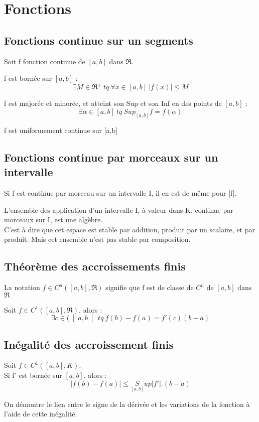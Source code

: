 \section{Fonctions}
\subsection{Fonctions continue sur un segments}
Soit f fonction continue de $\left[a,b\right] $ dans $\Re$.
\begin{prop}
f est bornée sur $\left[a,b\right]$ :
$$\exists M \in \Re^+~ tq~ \forall x \in \left[a,b\right]~ |f(x)| \leq M$$
\end{prop}
\begin{prop}
f est majorée et minorée, et atteint son Sup et son Inf en des points de $\left[a,b\right]$ : 
$$\exists \alpha \in \left[a,b\right]~ tq~ Sup_{\left[a,b\right]} f = f(\alpha)$$
\end{prop}
\begin{prop}
f est uniformement continue sur [a,b]
\end{prop}
\subsection{Fonctions continue par morceaux sur un intervalle}
\begin{prop}
Si f est continue par morceau sur un intervalle I, il en est de même pour |f|.
\end{prop}
\begin{prop}
L'ensemble des application d'un intervalle I, à valeur dans K, continue par morceaux sur I, est une algèbre.\\
C'est à dire que cet espace est stable par addition, produit par un scalaire, et par produit. Mais cet ensemble n'est pas stable par composition.
\end{prop}
\subsection{Théorème des accroissements finis}
La notation $f \in C^n(\left[a,b\right], \Re)$ signifie que f est de classe de $C^n$ de $\left[a,b\right]$ dans $\Re$
\begin{de}
Soit $f \in C^1(\left[a,b\right], \Re)$, alors : 
$$\exists c \in (\left]a,b\right[~ tq~ f(b)-f(a) = f'(c)(b-a)$$
\end{de}
\subsection{Inégalité des accroissement finis}
\begin{de}
Soit $f \in C^1(\left[a,b\right], K)$.\\
Si f' est bornée sur $\left[a,b\right]$, alors : 
$$|f(b) -f(a)| \leq \underset{\left[a,b\right]}Sup |f'|.(b-a)$$
\end{de}
On démontre le lien entre le signe de la dérivée et les variations de la fonction à l'aide de cette inégalité.
